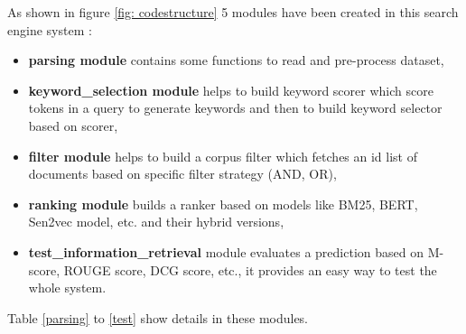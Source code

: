 As shown in figure \ref{fig: codestructure} 5 modules have been created in this search engine system :
\begin{itemize}
	\item \textbf{parsing module} contains some functions to read and pre-process dataset,
	\item \textbf{keyword\_selection module} helps to build keyword scorer which score tokens in a query to generate keywords and then to build keyword selector based on scorer, 
	\item \textbf{filter module} helps to build a corpus filter which fetches an id list of documents based on specific filter strategy (AND, OR), 
	\item \textbf{ranking module} builds a ranker based on models like BM25, BERT, Sen2vec model, etc. and their hybrid versions, 
	\item \textbf{test\_information\_retrieval} module evaluates a prediction based on M-score, ROUGE score, DCG score, etc., it provides an easy way to test the whole system.     		
\end{itemize}
Table \ref{parsing} to \ref{test} show details in these modules.

\begin{table}[htbp] 			
	\caption{\label{parsing}parsing} 
\end{table}

